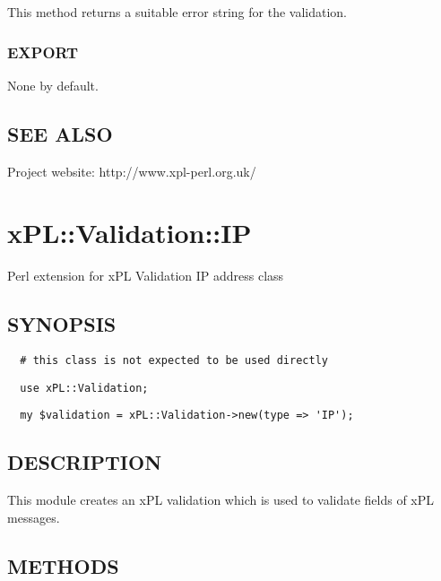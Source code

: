 \documentclass[12pt,a4paper]{article}
\begin{document}
This method returns a suitable error string for the validation.

\subsubsection*{EXPORT\label{xPL::Validation::IntegerRange_EXPORT}}


None by default.

\subsection*{SEE ALSO\label{xPL::Validation::IntegerRange_SEE_ALSO}}


Project website: http://www.xpl-perl.org.uk/

\newpage
\section{xPL::Validation::IP\label{xPL::Validation::IP}}


Perl extension for xPL Validation IP address class

\subsection*{SYNOPSIS\label{xPL::Validation::IP_SYNOPSIS}}
\begin{verbatim}
  # this class is not expected to be used directly
\end{verbatim}
\begin{verbatim}
  use xPL::Validation;
\end{verbatim}
\begin{verbatim}
  my $validation = xPL::Validation->new(type => 'IP');
\end{verbatim}
\subsection*{DESCRIPTION\label{xPL::Validation::IP_DESCRIPTION}}


This module creates an xPL validation which is used to validate fields
of xPL messages.

\subsection*{METHODS\label{xPL::Validation::IP_METHODS}}
\end{document}
